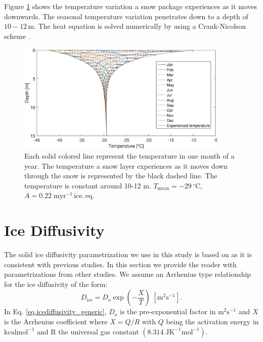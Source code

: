 \documentclass[11pt, draftcls, onecolumn]{IEEEtran} %
\numberwithin{equation}{section}
\numberwithin{table}{section}
\numberwithin{figure}{section}
\begin{document}
\begin{appendices}
Figure \ref{fig:firn_temp_profle} shows the temperature variation a snow package experiences as it moves downwards.
The seasonal temperature variation penetrates down to a depth of $10-12\, \mathrm{m}$. 
The heat equation is solved numerically by using a Crank-Nicolson scheme \citep{durran}.
\begin{figure}[]
	\vspace*{2mm}
	\begin{center}
		\includegraphics[width=0.9\textwidth]{Figure_15.eps}
		\caption{Each solid colored line represent the temperature in one month of a year. 
			The temperature a snow layer experiences as it moves down through the snow
			is represented by the black dashed line. 
			The temperature is constant around 10-12 m. $T_{\mathrm{mean}} = -29 \,^{\circ} \mathrm{C}$,
			$A = 0.22 \;\mathrm{myr^{-1}\,ice.\, eq.}$}  \label{fig:firn_temp_profle}
	\end{center}
\end{figure}


\section{Ice Diffusivity} \label{sec:appendix_ice_diffusion}
The solid ice diffusivity parametrization we use in this study is based on \cite{Ramseier1967} 
as it is consistent with previous studies.
In this section we provide the reader with parametrizations from other studies. 
We assume an Arrhenius type relationship for the ice diffusivity of the form:
\begin{equation}
D_{\mathrm{ice}} = D_o \exp \left(- \frac{X}{T} \right) \;\mathrm{ [m^2 s^{-1}]} . 
\label{eq.icediffusivity_generic}
\end{equation}
In Eq. \ref{eq.icediffusivity_generic}, $D_o$ is the pre-exponential factor in $\mathrm{m^2s^{-1}}$
and $X$ is the Arrhenius coefficient where $X = Q/R$ with $Q$ being the activation energy in 
$\mathrm{kcalmol^{-1}}$ and R the universal gas constant $(8.314 \; \mathrm{JK^{-1}mol^{-1}})$.


\end{appendices}
\end{document}
